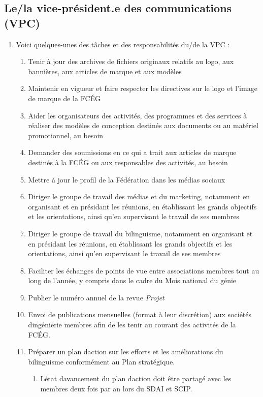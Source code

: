 \subsection{Le/la vice-président.e des communications (VPC)}
\label{le-la-vice-president-e-des-communications-vpc}

\begin{enumerate}
 \item
  Voici quelques-unes des tâches et des responsabilités du/de la VPC :

  \begin{enumerate}
   \item
    Tenir à jour des archives de fichiers originaux relatifs au logo, aux bannières, aux articles de marque et aux modèles
   \item
    Maintenir en vigueur et faire respecter les directives sur le logo et l'image de marque de la FCÉG
   \item
    Aider les organisateurs des activités, des programmes et des services à réaliser des modèles de conception destinés aux documents ou au matériel promotionnel, au besoin
   \item
    Demander des soumissions en ce qui a trait aux articles de marque destinés à la FCÉG ou aux responsables des activités, au besoin
   \item
    Mettre à jour le profil de la Fédération dans les médias sociaux
   \item
    Diriger le groupe de travail des médias et du marketing, notamment en organisant et en présidant les réunions, en établissant les grands objectifs et les orientations, ainsi qu'en supervisant le travail de ses membres
   \item
    Diriger le groupe de travail du bilinguisme, notamment en organisant et en présidant les réunions, en établissant les grands objectifs et les orientations, ainsi qu'en supervisant le travail de ses membres
   \item
    Faciliter les échanges de points de vue entre associations membres tout au long de l'année, y compris dans le cadre du Mois national du génie
   \item
    Publier le numéro annuel de la revue \emph{Projet}
   \item
    Envoi de publications mensuelles (format à leur discrétion) aux sociétés d\textquotesingle ingénierie membres afin de les tenir au courant des activités de la FCÉG.
   \item
    Préparer un plan d\textquotesingle action sur les efforts et les améliorations du bilinguisme conformément au Plan stratégique.

    \begin{enumerate}
     \item
      L\textquotesingle état d\textquotesingle avancement du plan d\textquotesingle action doit être partagé avec les membres deux fois par an lors du SDAI et SCIP.
    \end{enumerate}
  \end{enumerate}
\end{enumerate}

